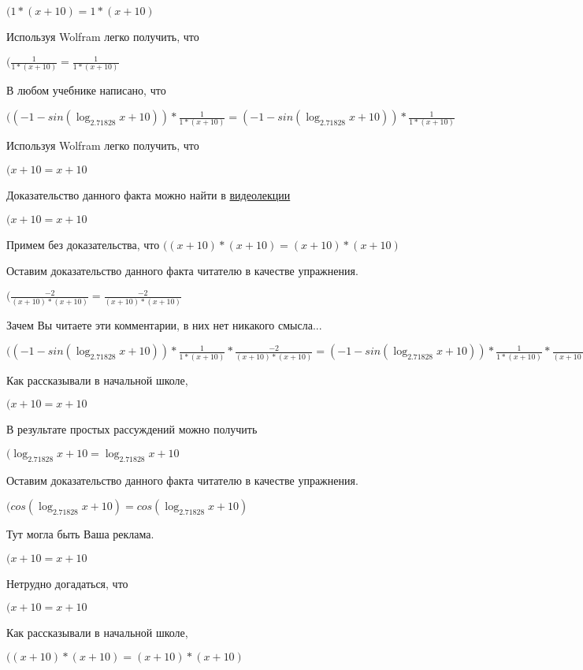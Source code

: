 \documentclass[12pt,a4paper,fleqn]{article}
\theoremstyle{definition}
\begin{document}
$( 1  * ( x  +  10 ) =  1  * ( x  +  10 )$

Используя Wolfram легко получить, что

$(\frac{ 1 }{ 1  * ( x  +  10 )}
 = \frac{ 1 }{ 1  * ( x  +  10 )}
$

В любом учебнике написано, что

$(( -1  - sin(\log_{ 2.71828 }{ x  +  10 })) * \frac{ 1 }{ 1  * ( x  +  10 )}
 = ( -1  - sin(\log_{ 2.71828 }{ x  +  10 })) * \frac{ 1 }{ 1  * ( x  +  10 )}
$

Используя Wolfram легко получить, что

$( x  +  10  =  x  +  10 $

Доказательство данного факта можно найти в \href{https://www.youtube.com/watch?v=dQw4w9WgXcQ}{видеолекции}

$( x  +  10  =  x  +  10 $

Примем без доказательства, что
$(( x  +  10 ) * ( x  +  10 ) = ( x  +  10 ) * ( x  +  10 )$

Оставим доказательство данного факта читателю в качестве упражнения.

$(\frac{ -2 }{( x  +  10 ) * ( x  +  10 )}
 = \frac{ -2 }{( x  +  10 ) * ( x  +  10 )}
$

Зачем Вы читаете эти комментарии, в них нет никакого смысла...

$(( -1  - sin(\log_{ 2.71828 }{ x  +  10 })) * \frac{ 1 }{ 1  * ( x  +  10 )}
 * \frac{ -2 }{( x  +  10 ) * ( x  +  10 )}
 = ( -1  - sin(\log_{ 2.71828 }{ x  +  10 })) * \frac{ 1 }{ 1  * ( x  +  10 )}
 * \frac{ -2 }{( x  +  10 ) * ( x  +  10 )}
$

Как рассказывали в начальной школе,

$( x  +  10  =  x  +  10 $

В результате простых рассуждений можно получить

$(\log_{ 2.71828 }{ x  +  10 } = \log_{ 2.71828 }{ x  +  10 }$

Оставим доказательство данного факта читателю в качестве упражнения.

$(cos(\log_{ 2.71828 }{ x  +  10 }) = cos(\log_{ 2.71828 }{ x  +  10 })$

Тут могла быть Ваша реклама.

$( x  +  10  =  x  +  10 $

Нетрудно догадаться, что

$( x  +  10  =  x  +  10 $

Как рассказывали в начальной школе,

$(( x  +  10 ) * ( x  +  10 ) = ( x  +  10 ) * ( x  +  10 )$
\end{document}
